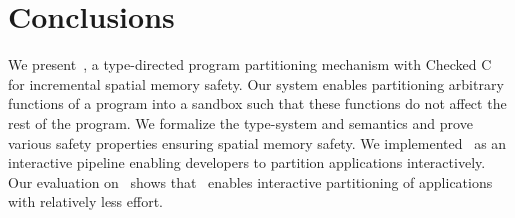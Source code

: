 \section{Conclusions}
\label{sec:conclude}
We present~\systemname{}, a type-directed program partitioning mechanism with Checked C for incremental spatial memory safety.
Our system enables partitioning arbitrary functions of a program into a sandbox such that these functions do not affect the rest of the program.
We formalize the type-system and semantics and prove various safety properties ensuring spatial memory safety.
We implemented~\systemname{} as an interactive pipeline enabling developers to partition applications interactively.
Our evaluation on~\numprog{} shows that~\systemname{} enables interactive partitioning of applications with relatively less effort.


%
